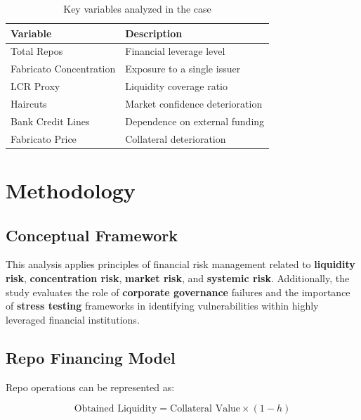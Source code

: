 \begin{table}[h!]
\centering
\begin{tabular}{|l|l|}
\hline
\textbf{Variable} & \textbf{Description} \\ \hline
Total Repos & Financial leverage level \\ \hline
Fabricato Concentration & Exposure to a single issuer \\ \hline
LCR Proxy & Liquidity coverage ratio \\ \hline
Haircuts & Market confidence deterioration \\ \hline
Bank Credit Lines & Dependence on external funding \\ \hline
Fabricato Price & Collateral deterioration \\ \hline
\end{tabular}
\caption{Key variables analyzed in the case}
\end{table}

\vspace{0.5cm}

\section{Methodology}

\subsection{Conceptual Framework}

This analysis applies principles of financial risk management related to \textbf{liquidity risk}, \textbf{concentration risk}, \textbf{market risk}, and \textbf{systemic risk}. Additionally, the study evaluates the role of \textbf{corporate governance} failures and the importance of \textbf{stress testing} frameworks in identifying vulnerabilities within highly leveraged financial institutions.

\vspace{0.3cm}

\subsection{Repo Financing Model}

Repo operations can be represented as:

\begin{equation}
\text{Obtained Liquidity} = \text{Collateral Value} \times (1 - h)
\end{equation}

